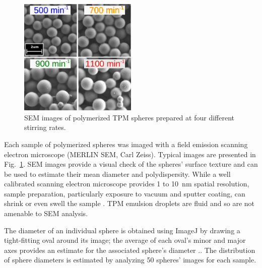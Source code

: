 \documentclass[journal=langd5,manuscript=article]{achemso}
\begin{document}
\begin{figure}
  \centering
  \includegraphics[width=0.5\textwidth]{semimages03}
  \caption{SEM images of polymerized TPM spheres
    prepared at four different stirring rates.}
  \label{fig:semimages}
\end{figure}

Each sample of polymerized spheres was imaged with a 
field emission scanning electron microscope
(MERLIN SEM, Carl Zeiss).
Typical images are presented in Fig.~\ref{fig:semimages}.
SEM images provide a visual check of the spheres' surface
texture and can be used to estimate their mean
diameter and polydispersity.
While a well calibrated scanning
electron microscope provides \num{1} to \SI{10}{\nm} spatial resolution, sample
preparation, particularly exposure to vacuum and sputter coating, can shrink or 
even swell the sample \cite{yamada85,jung02}.
TPM emulsion droplets are fluid and so
are not amenable to SEM analysis.

The diameter of an individual sphere is obtained 
using ImageJ by drawing a tight-fitting oval around its image;
the average of each oval's minor and major axes provides an estimate for the associated sphere's diameter \cite{klein2011traceable,mazzoli12}..
The distribution of sphere diameters is
estimated by analyzing \num{50} spheres' images
for each sample.
\end{document}
